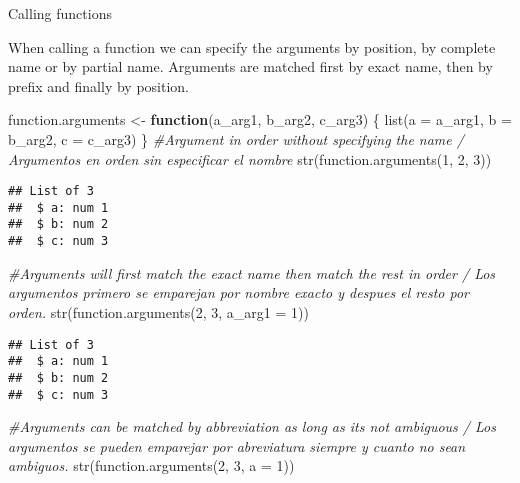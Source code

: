 \documentclass[
]{article}
\newenvironment{Shaded}{\begin{snugshade}}{\end{snugshade}}
\newcommand{\AttributeTok}[1]{\textcolor[rgb]{0.77,0.63,0.00}{#1}}
\newcommand{\CommentTok}[1]{\textcolor[rgb]{0.56,0.35,0.01}{\textit{#1}}}
\newcommand{\ControlFlowTok}[1]{\textcolor[rgb]{0.13,0.29,0.53}{\textbf{#1}}}
\newcommand{\DecValTok}[1]{\textcolor[rgb]{0.00,0.00,0.81}{#1}}
\newcommand{\FunctionTok}[1]{\textcolor[rgb]{0.00,0.00,0.00}{#1}}
\newcommand{\NormalTok}[1]{#1}
\newcommand{\OtherTok}[1]{\textcolor[rgb]{0.56,0.35,0.01}{#1}}
\begin{document}
Calling functions

When calling a function we can specify the arguments by position, by
complete name or by partial name. Arguments are matched first by exact
name, then by prefix and finally by position.

\begin{Shaded}
\begin{Highlighting}[]
\NormalTok{function.arguments }\OtherTok{\textless{}{-}} \ControlFlowTok{function}\NormalTok{(a\_arg1, b\_arg2, c\_arg3) \{}
  \FunctionTok{list}\NormalTok{(}\AttributeTok{a =}\NormalTok{ a\_arg1, }\AttributeTok{b =}\NormalTok{ b\_arg2, }\AttributeTok{c =}\NormalTok{ c\_arg3)}
\NormalTok{\}}
\CommentTok{\#Argument in order without specifying the name / Argumentos en orden sin especificar el nombre}
\FunctionTok{str}\NormalTok{(}\FunctionTok{function.arguments}\NormalTok{(}\DecValTok{1}\NormalTok{, }\DecValTok{2}\NormalTok{, }\DecValTok{3}\NormalTok{))}
\end{Highlighting}
\end{Shaded}

\begin{verbatim}
## List of 3
##  $ a: num 1
##  $ b: num 2
##  $ c: num 3
\end{verbatim}

\begin{Shaded}
\begin{Highlighting}[]
\CommentTok{\#Arguments will first match the exact name then match the rest in order / Los argumentos primero se emparejan por nombre exacto y despues el resto por orden.}
\FunctionTok{str}\NormalTok{(}\FunctionTok{function.arguments}\NormalTok{(}\DecValTok{2}\NormalTok{, }\DecValTok{3}\NormalTok{, }\AttributeTok{a\_arg1 =} \DecValTok{1}\NormalTok{))}
\end{Highlighting}
\end{Shaded}

\begin{verbatim}
## List of 3
##  $ a: num 1
##  $ b: num 2
##  $ c: num 3
\end{verbatim}

\begin{Shaded}
\begin{Highlighting}[]
\CommentTok{\#Arguments can be matched by abbreviation as long as its not ambiguous / Los argumentos se pueden emparejar por abreviatura siempre y cuanto no sean ambiguos.}
\FunctionTok{str}\NormalTok{(}\FunctionTok{function.arguments}\NormalTok{(}\DecValTok{2}\NormalTok{, }\DecValTok{3}\NormalTok{, }\AttributeTok{a =} \DecValTok{1}\NormalTok{))}
\end{Highlighting}
\end{Shaded}
\end{document}
